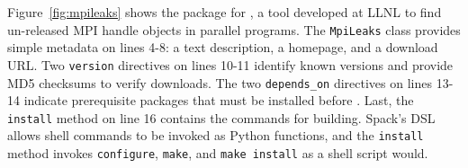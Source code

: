 Figure~\ref{fig:mpileaks} shows the package for \mpileaks, a tool developed
at LLNL to find un-released MPI handle objects in parallel programs.
The {\tt MpiLeaks} class provides simple metadata on lines 4-8: a text
description, a homepage, and a download URL.
Two {\tt version} directives on lines 10-11 identify known versions and provide
MD5 checksums to verify downloads.
The two {\tt depends\_on} directives on lines 13-14 indicate prerequisite
packages that must be installed before \mpileaks.
Last, the {\tt install} method on line 16 contains the commands for building.
Spack's DSL allows shell commands to be invoked as Python functions,
and the {\tt install} method invokes {\tt configure},
{\tt make}, and {\tt make install} as a shell script would.
